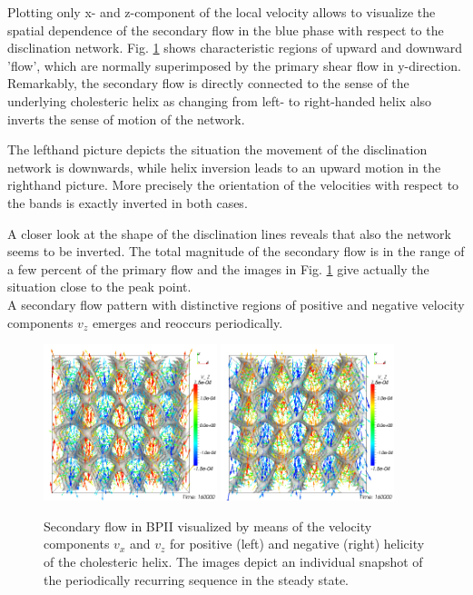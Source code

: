 \documentclass[aps,pre,twocolumn,groupedaddress]{revtex4-1}
\begin{document}
Plotting only x- and z-component of the local velocity allows to visualize the spatial dependence of the secondary flow in the blue phase with respect to the disclination network.
Fig. \ref{fig3} shows characteristic regions of upward and downward 'flow', which are normally superimposed by the primary shear flow in y-direction.
Remarkably, the secondary flow is directly connected to the sense of the underlying cholesteric helix as changing from left- to right-handed helix also inverts the sense of motion of the network.

The lefthand picture depicts the situation the movement of the disclination network is downwards, while helix inversion leads to an upward motion in the righthand picture.
More precisely the orientation of the velocities with respect to the bands is exactly inverted in both cases. 

A closer look at the shape of the disclination lines reveals that also the network seems to be inverted. 
The total magnitude of the secondary flow is in the range of a few percent of the primary flow and the images in Fig. \ref{fig3} give actually the situation close to the peak point.\\ 

A secondary flow pattern with distinctive regions of positive and negative velocity components $v_z$ emerges and reoccurs periodically.



\begin{figure}[h]
\includegraphics[width=0.45\textwidth]{v_xz-v_z-160k_run902.png}
\includegraphics[width=0.45\textwidth]{v_xz-v_z-160k_run903.png}
\caption{Secondary flow in BPII visualized by means of the velocity components $v_x$ and $v_z$ for positive (left) and negative (right) helicity of the cholesteric helix. The images depict an individual snapshot of the periodically recurring sequence in the steady state.}
\label{fig3}
\end{figure}
\end{document}
